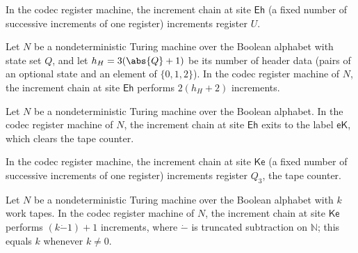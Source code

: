 \begin{lemma}
\label{Complexity.Codec.icReg_Eh}
\leanok
{}
In the codec register machine, the increment chain at site $\mathsf{Eh}$ (a fixed number
of successive increments of one register) increments register $U$.
\end{lemma}

\begin{lemma}
\label{Complexity.Codec.icCount_Eh}
\leanok
{}
Let $N$ be a nondeterministic Turing machine over the Boolean alphabet with state set $Q$,
and let $h_H = 3(\abs{Q}+1)$ be its number of header data (pairs of an optional state
and an element of $\{0,1,2\}$). In the codec register machine of $N$, the increment chain
at site $\mathsf{Eh}$ performs $2(h_H + 2)$ increments.
\end{lemma}

\begin{lemma}
\label{Complexity.Codec.icNext_Eh}
\leanok
{}
Let $N$ be a nondeterministic Turing machine over the Boolean alphabet. In the codec
register machine of $N$, the increment chain at site $\mathsf{Eh}$ exits to the label
$\mathsf{eK}$, which clears the tape counter.
\end{lemma}

\begin{lemma}
\label{Complexity.Codec.icReg_Ke}
\leanok
{}
In the codec register machine, the increment chain at site $\mathsf{Ke}$ (a fixed number
of successive increments of one register) increments register $Q_3$, the tape counter.
\end{lemma}

\begin{lemma}
\label{Complexity.Codec.icCount_Ke}
\leanok
{}
Let $N$ be a nondeterministic Turing machine over the Boolean alphabet with $k$ work
tapes. In the codec register machine of $N$, the increment chain at site $\mathsf{Ke}$
performs $(k \mathbin{\dot-} 1) + 1$ increments, where $\dot-$ is truncated subtraction
on $\mathbb{N}$; this equals $k$ whenever $k \neq 0$.
\end{lemma}

